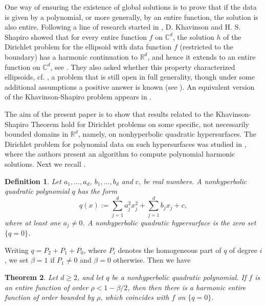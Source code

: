 \documentclass[12pt]{amsart}
\newtheorem{theorem}{Theorem}
\newtheorem{definition}[theorem]{Definition}
\begin{document}
 One way of ensuring the existence of global solutions is to prove
 that if the data is given by a polynomial, or more generally, by an entire function, the solution
 is also entire. Following a line of research started in \cite{Shap89},  D. Khavinson and H. S. Shapiro showed that for every entire function $f$ on $\mathbb{C}^{d}$, the solution $h$
of the Dirichlet problem for the ellipsoid with data function $f$ (restricted to
the boundary) has a harmonic continuation to $\mathbb{R}^{d}$, and hence it extends to an entire function on $\mathbb{C}^{d}$, see \cite[Theorem 1]{KhSh92}. They also asked whether this property characterized ellipsoids,
cf. \cite[Page 460]{KhSh92}, a problem that  is still open in full generality, though
under some additional assumptions a positive answer is known (see \cite[Theorem 27]{Rend08}). An equivalent version of the Khavinson-Shapiro problem appears in \cite{Rend16}.
 
 The aim of the present paper is to show that results related to the Khavinson-Shapiro Theorem hold for Dirichlet
problems on some specific, not necessarily bounded domains in $\mathbb{R}^{d}$, namely, on nonhyperbolic quadratic hypersurfaces.  The Dirichlet problem for polynomial data on such hypersurfaces 
was studied in \cite{AGV04}, where the authors present an algorithm to compute polynomial harmonic solutions.
Next we recall  \cite[Definition 4]{AGV04}. 

\begin{definition}   \label{D:nonhyperbolic} Let  $a_{1},\dots , a_d$, $b_1, \ldots, b_d$ and $c$,  be real numbers.
A \textit{nonhyperbolic} quadratic polynomial $q$ has the form
\[
q(x) := \sum_{j = 1}^d a_j^2 x_j^2 + \sum_{j=1}^d b_jx_j + c,
\]
where at least one $a_j \ne 0$. A nonhyperbolic quadratic hypersurface is the zero set $\{q = 0\}$.
\end{definition}




Writing $q = P_2 + P_1 + P_0$, where $P_i$ denotes the homogeneous part of $q$ of degree $i$, we set 
$\beta =1$ if $P_1 \ne 0$ and $\beta = 0$ otherwise. Then we have

\begin{theorem} \label{arbdimParCyl}
Let  $d\geq 2$, and let $q$  be a nonhyperbolic quadratic polynomial. If $f$ is an entire function of order $\rho < 1 - \beta/2$, then then there is a harmonic entire function of order bounded by $\rho$, which coincides with $f$ 
on $\{q = 0\}$.
\end{theorem}
\end{document}
